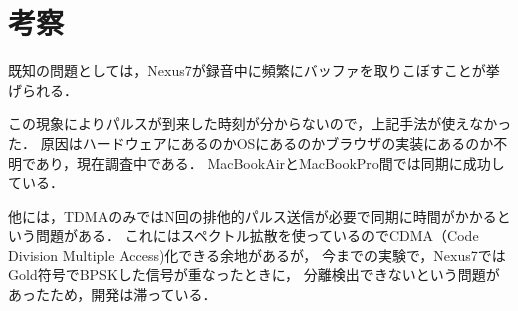 \chapter{考察}

既知の問題としては，Nexus7が録音中に頻繁にバッファを取りこぼすことが挙げられる．


この現象によりパルスが到来した時刻が分からないので，上記手法が使えなかった．
原因はハードウェアにあるのかOSにあるのかブラウザの実装にあるのか不明であり，現在調査中である．
MacBookAirとMacBookPro間では同期に成功している．

他には，TDMAのみではN回の排他的パルス送信が必要で同期に時間がかかるという問題がある．
これにはスペクトル拡散を使っているのでCDMA（Code Division Multiple Access)化できる余地があるが，
今までの実験で，Nexus7ではGold符号でBPSKした信号が重なったときに，
分離検出できないという問題があったため，開発は滞っている．
